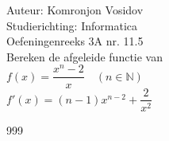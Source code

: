 \documentclass[a4paper]{article}
\begin{document}
	
	\noindent \large Auteur: Komronjon Vosidov \\
	\noindent \large Studierichting: Informatica\\
	\noindent \large Oefeningenreeks 3A nr. 11.5\\
	
	
	
	\normalsize
	Bereken de afgeleide functie van\\
	
	$f(x) = \dfrac{x^n - 2}{x} \quad (n \in \mathbb{N})$\\
	
	$f'(x) = (n-1)x^{n-2}+\dfrac{2}{x^2}$\\
	
	
	
	
	\begin{thebibliography}{999}
	\end{thebibliography}	
	
\end{document}
